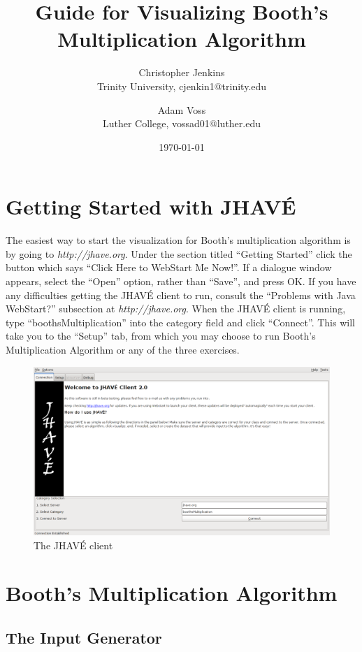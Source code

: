 \documentclass{article}
\title{Guide for Visualizing Booth's Multiplication Algorithm}
\date{\today}
\author{Christopher Jenkins\\ Trinity University, cjenkin1@trinity.edu
    \and Adam Voss\\ Luther College, vossad01@luther.edu}
\begin{document}
\maketitle
\tableofcontents

\pagebreak

\section{Getting Started with JHAVÉ}
The easiest way to start the visualization for Booth's multiplication algorithm is by going to \emph{http://jhave.org}.
Under the section titled ``Getting Started'' click the button which says ``Click Here to WebStart Me Now!''.
If a dialogue window appears, select the ``Open'' option, rather than ``Save'', and press OK.
If you have any difficulties getting the JHAVÉ client to run, consult the ``Problems with Java WebStart?'' subsection at \emph{http://jhave.org}.
When the JHAVÉ client is running, type ``boothsMultiplication'' into the category field and click ``Connect''.
This will take you to the ``Setup'' tab, from which you may choose to run Booth's Multiplication Algorithm or any of the three exercises.

\begin{figure}[h]
\centering
\includegraphics[scale=0.3]{start.pdf}
\caption{The JHAVÉ client}
\end{figure}

\pagebreak

\section{Booth's Multiplication Algorithm}
\subsection{The Input Generator}
\end{document}
